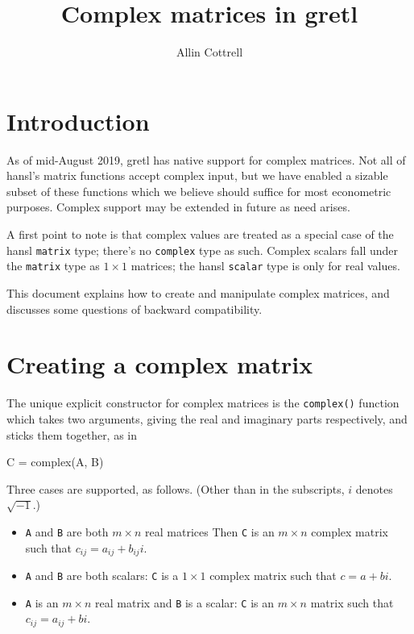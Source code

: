 \documentclass{article}
\begin{document}
\setlength{\parindent}{0pt}
\setlength{\parskip}{1ex}
\setcounter{secnumdepth}{2}

\title{Complex matrices in gretl}
\author{Allin Cottrell}
\maketitle

\section{Introduction}
\label{sec:intro}

As of mid-August 2019, gretl has native support for complex
matrices. Not all of hansl's matrix functions accept complex input,
but we have enabled a sizable subset of these functions which we
believe should suffice for most econometric purposes. Complex support
may be extended in future as need arises.

A first point to note is that complex values are treated as a special
case of the hansl \texttt{matrix} type; there's no \texttt{complex}
type as such. Complex scalars fall under the \texttt{matrix} type as
$1 \times 1$ matrices; the hansl \texttt{scalar} type is only for real
values.

This document explains how to create and manipulate complex matrices,
and discusses some questions of backward compatibility.

\section{Creating a complex matrix}
\label{sec:create}

The unique explicit constructor for complex matrices is the
\texttt{complex()} function which takes two arguments, giving the real
and imaginary parts respectively, and sticks them together, as in
\begin{code}
C = complex(A, B)
\end{code}
Three cases are supported, as follows. (Other than in the subscripts,
$i$ denotes $\sqrt{-1}$.)
\begin{itemize}
\item \texttt{A} and \texttt{B} are both $m \times n$ real matrices
  Then \texttt{C} is an $m \times n$ complex matrix such that
  $c_{ij} = a_{ij} + b_{ij}i$.
\item \texttt{A} and \texttt{B} are both scalars: \texttt{C} is a
  $1 \times 1$ complex matrix such that $c = a + bi$.
\item \texttt{A} is an $m \times n$ real matrix and \texttt{B} is a
  scalar: \texttt{C} is an $m \times n$ matrix such that
  $c_{ij} = a_{ij} + bi$.
\end{itemize}
\end{document}
